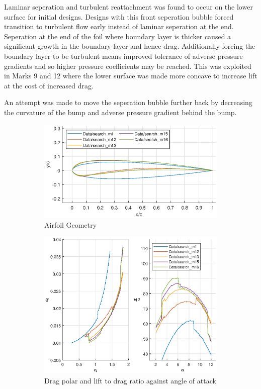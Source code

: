 \documentclass{article}
\begin{document}
Laminar seperation and turbulent reattachment was found to occur on the lower surface for initial designs.
Designs with this front seperation bubble forced transition to turbulent flow early instead of laminar seperation at the end.
Seperation at the end of the foil where boundary layer is thicker caused a significant growth in the boundary layer and hence drag.
Additionally forcing the boundary layer to be turbulent means improved tolerance of adverse pressure gradients and so higher pressure coefficients may be reached.
This was exploited in Marks 9 and 12 where the lower surface was made more concave to increase lift at the cost of increased drag.

An attempt was made to move the seperation bubble further back by decreasing the curvature of the bump and adverse pressure gradient behind the bump.

\begin{figure}[H]
    \begin{subfigure}{0.54\textwidth}
        \centering
        \includegraphics[width=1.2\textwidth, center]{figures/loRe_geometry_16.eps}
        \caption{Airfoil Geometry}
        \label{fig:m16_geometry}
    \end{subfigure}
    \begin{subfigure}{0.45\textwidth}
        \centering
        \includegraphics[width=1.2\textwidth, center]{figures/loRe_lod_16.eps}
        \caption{Drag polar and lift to drag ratio against angle of attack}
        \label{fig:m16_lod}
    \end{subfigure}
    \caption{}
\end{figure}
\end{document}
